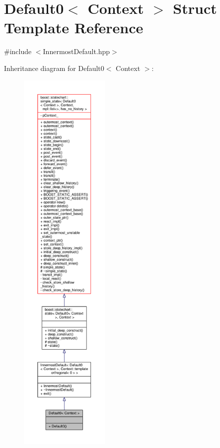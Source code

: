 \hypertarget{struct_default0}{}\section{Default0$<$ Context $>$ Struct Template Reference}
\label{struct_default0}


{\ttfamily \#include $<$Innermost\+Default.\+hpp$>$}



Inheritance diagram for Default0$<$ Context $>$\+:
\nopagebreak
\begin{figure}[H]
\begin{center}
\leavevmode
\includegraphics[height=550pt]{struct_default0__inherit__graph}
\end{center}
\end{figure}


